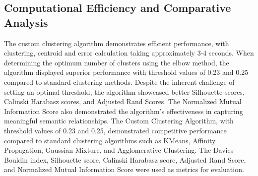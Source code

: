 \documentclass{article}
\begin{document}
\subsection{Computational Efficiency and Comparative Analysis}
The custom clustering algorithm demonstrates efficient performance, with clustering, centroid and error calculation taking approximately 3-4 seconds. When determining the optimum number of clusters using the elbow method, the algorithm displayed superior performance with threshold values of 0.23 and 0.25 compared to standard clustering methods. Despite the inherent challenge of setting an optimal threshold, the algorithm showcased better Silhouette scores, Calinski Harabasz scores, and Adjusted Rand Scores. The Normalized Mutual Information Score also demonstrated the algorithm's effectiveness in capturing meaningful semantic relationships. The Custom Clustering Algorithm, with threshold values of 0.23 and 0.25, demonstrated competitive performance compared to standard clustering algorithms such as KMeans, Affinity Propagation, Gaussian Mixture, and Agglomerative Clustering. The Davies-Bouldin index, Silhouette score, Calinski Harabasz score, Adjusted Rand Score, and Normalized Mutual Information Score were used as metrics for evaluation.
\begin{table}[ht]
    \centering
    \caption{Optimum Number of Clusters}
    \label{tab:my_label}
\end{table}
\end{document}
